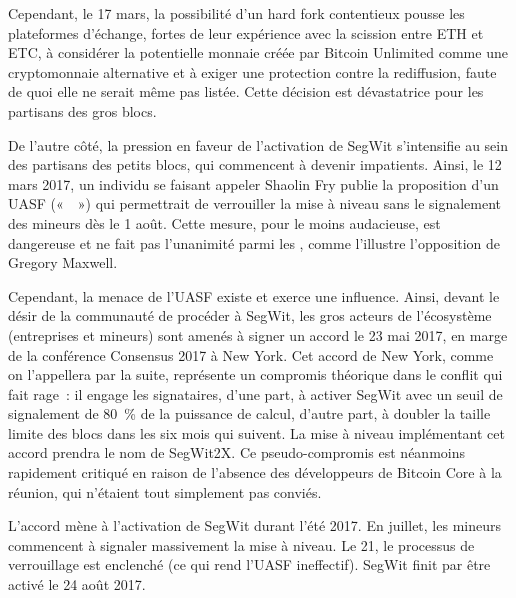 Cependant, le 17 mars, la possibilité d'un hard fork contentieux pousse les plateformes d'échange, fortes de leur expérience avec la scission entre ETH et ETC, à considérer la potentielle monnaie créée par Bitcoin Unlimited comme une cryptomonnaie alternative et à exiger une protection contre la rediffusion, faute de quoi elle ne serait même pas listée. Cette décision est dévastatrice pour les partisans des gros blocs.

De l'autre côté, la pression en faveur de l'activation de SegWit s'intensifie au sein des partisans des petits blocs, qui commencent à devenir impatients. Ainsi, le 12 mars 2017, un individu se faisant appeler Shaolin Fry publie la proposition d'un UASF («~~») qui permettrait de verrouiller la mise à niveau sans le signalement des mineurs dès le 1\ier{} août. Cette mesure, pour le moins audacieuse, est dangereuse et ne fait pas l'unanimité parmi les , comme l'illustre l'opposition de Gregory Maxwell.

Cependant, la menace de l'UASF existe et exerce une influence. Ainsi, devant le désir de la communauté de procéder à SegWit, les gros acteurs de l'écosystème (entreprises et mineurs) sont amenés à signer un accord le 23 mai 2017, en marge de la conférence Consensus 2017 à New York. Cet accord de New York, comme on l'appellera par la suite, représente un compromis théorique dans le conflit qui fait rage~: il engage les signataires, d'une part, à activer SegWit avec un seuil de signalement de 80~\% de la puissance de calcul, d'autre part, à doubler la taille limite des blocs dans les six mois qui suivent. La mise à niveau implémentant cet accord prendra le nom de SegWit2X. Ce pseudo-compromis est néanmoins rapidement critiqué en raison de l'absence des développeurs de Bitcoin Core à la réunion, qui n'étaient tout simplement pas conviés.

L'accord mène à l'activation de SegWit durant l'été 2017. En juillet, les mineurs commencent à signaler massivement la mise à niveau. Le 21, le processus de verrouillage est enclenché (ce qui rend l'UASF ineffectif). SegWit finit par être activé le 24 août 2017.

